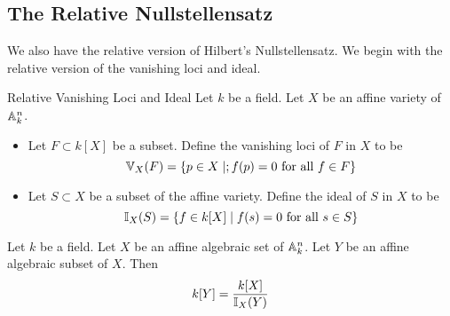 \documentclass[a4paper]{article}
\begin{document}
\subsection{The Relative Nullstellensatz}
We also have the relative version of Hilbert's Nullstellensatz. We begin with the relative version of the vanishing loci and ideal. 

\begin{defn}{Relative Vanishing Loci and Ideal}{} Let $k$ be a field. Let $X$ be an affine variety of $\mathbb{A}_k^n$. 
\begin{itemize}
\item Let $F\subset k[X]$ be a subset. Define the vanishing loci of $F$ in $X$ to be $$\mathbb{V}_X(F)=\{p\in X\;|;f(p)=0\text{ for all }f\in F\}$$
\item Let $S\subset X$ be a subset of the affine variety. Define the ideal of $S$ in $X$ to be $$\mathbb{I}_X(S)=\{f\in k[X]\;|\;f(s)=0\text{ for all }s\in S\}$$
\end{itemize}
\end{defn}

\begin{lmm}{}{} Let $k$ be a field. Let $X$ be an affine algebraic set of $\mathbb{A}_k^n$. Let $Y$ be an affine algebraic subset of $X$. Then $$k[Y]=\frac{k[X]}{\mathbb{I}_X(Y)}$$
\end{lmm}
\end{document}
